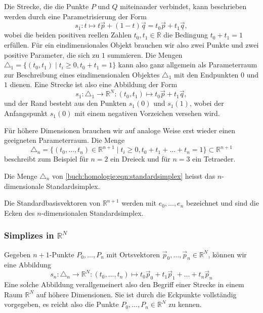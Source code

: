 Die Strecke, die die Punkte $P$ und $Q$ miteinander verbindet,
kann beschrieben werden durch eine Parametrisierung
der Form
\begin{equation}
s_1
\colon
t
\mapsto
t\vec{p} + (1-t) \vec{q}
=
t_0 \vec{p} + t_1\vec{q},
\end{equation}
wobei die beiden positiven reellen Zahlen $t_0,t_1\in\mathbb{R}$ die
Bedingung $t_0 + t_1 = 1$ erfüllen.
Für ein eindimensionales Objekt brauchen wir also zwei Punkte und zwei
positive Parameter, die sich zu $1$ summieren.
Die Mengen $\triangle_1=\{ (t_0,t_1)\mid t_i\ge 0, t_0+t_1=1\}$ kann also
ganz allgemein als Parameterraum zur Beschreibung eines eindimensionalen Objektes
$\triangle_1$
mit den Endpunkten $0$ und $1$ dienen.
Eine Strecke ist also eine Abbildung der Form
\begin{equation}
s_1
\colon
\triangle_1 \to \mathbb{R}^N
:
(t_0,t_1)
\mapsto
t_0 \vec{p} + t_1\vec{q},
\end{equation}
und der Rand besteht aus den Punkten $s_1(0)$ und $s_1(1)$, wobei der
Anfangspunkt $s_1(0)$ mit einem negativen Vorzeichen versehen wird.

Für höhere Dimensionen brauchen wir auf analoge Weise erst wieder einen
geeigneten Parameterraum.
Die Menge
\begin{equation}
\triangle_n
=
\{(t_0,\dots,t_n)\in\mathbb{R}^{n+1}\mid t_i\ge 0,t_0+t_1+\dots+t_n=1\}
\subset\mathbb{R}^{n+1}
\label{buch:homologie:eqn:standardsimplex}
\end{equation}
beschreibt zum Beispiel für $n=2$ ein Dreieck und für $n=3$ ein 
Tetraeder.
%

\begin{definition}
Die Menge $\triangle_n$ von \eqref{buch:homologie:eqn:standardsimplex}
heisst das $n$-dimensionale Standardsimplex.
%
\end{definition}

Die Standardbasisvektoren von  $\mathbb{R}^{n+1}$ werden mit $e_0,\dots,e_n$
bezeichnet und sind die Ecken des $n$-dimensionalen Standardsimplex.

\subsubsection{Simplizes in $\mathbb{R}^N$}
Gegeben $n+1$-Punkte $P_0,\dots,P_n$ mit Ortsvektoren
$\vec{p}_0,\dots,\vec{p}_n\in\mathbb{R}^N$, können wir eine Abbildung
\begin{equation}
s_n
\colon
\triangle_n
\to
\mathbb{R}^N
:
(t_0,\dots,t_n)
\mapsto
t_0\vec{p}_0
+
t_1\vec{p}_1
+
\dots
+
t_n\vec{p}_n
\end{equation}
Eine solche Abbildung verallgemeinert also den Begriff einer Strecke
in einem Raum $\mathbb{R}^N$  
auf höhere Dimensionen.
Sie ist durch die Eckpunkte vollständig vorgegeben, es reicht also
die Punkte $P_0,\dots,P_n\in\mathbb{R}^N$ zu kennen.

